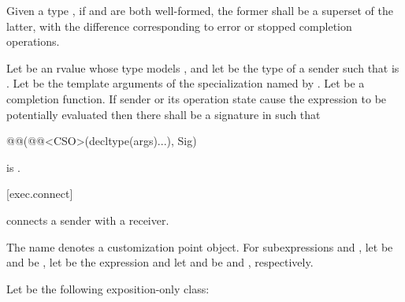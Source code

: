 \pnum
Given a type , if
 and
are both well-formed,
the former shall be a superset of the latter,
with the difference corresponding to error or stopped completion operations.

\pnum
Let  be an rvalue
whose type  models , and
let  be the type of a sender
such that  is .
Let  be the template arguments of
the  specialization
named by .
Let  be a completion function.
If sender  or its operation state cause
the expression 
to be potentially evaluated
then there shall be a signature  in 
such that
\begin{codeblock}
@@(@@<CSO>(decltype(args)...), Sig)
\end{codeblock}
is .

[exec.connect]{}

\pnum
{} connects a sender with a receiver.

\pnum
The name  denotes a customization point object.
For subexpressions  and ,
let  be  and
 be ,
let  be the expression
and let  and  be
 and , respectively.

\pnum
Let  be the following exposition-only class:

